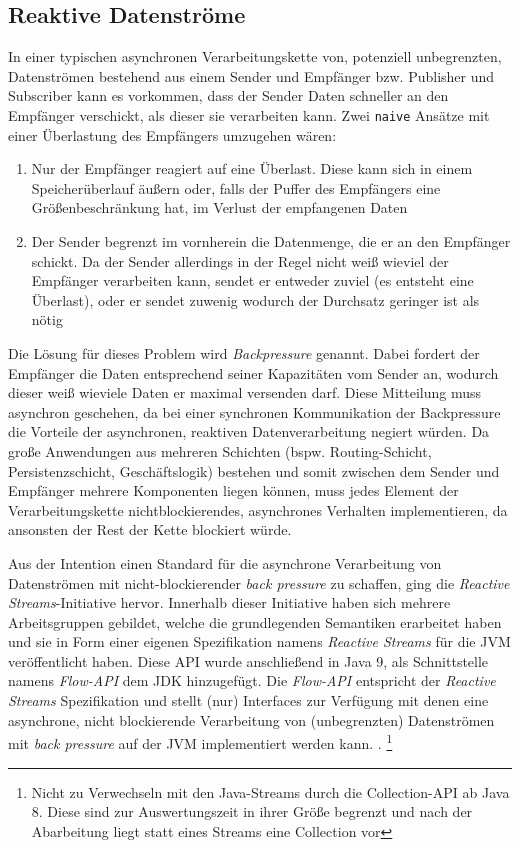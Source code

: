 \subsection{Reaktive Datenströme}
\label{section:reaktive_datenströme}
In einer typischen asynchronen Verarbeitungskette von, potenziell unbegrenzten, Datenströmen
bestehend aus einem Sender und Empfänger bzw. Publisher und Subscriber kann es vorkommen,
dass der Sender Daten schneller an den Empfänger verschickt, als dieser sie verarbeiten kann.
Zwei \verb|naive| Ansätze mit einer Überlastung des Empfängers umzugehen wären:
\begin{enumerate}
    \item Nur der Empfänger reagiert auf eine Überlast. Diese kann sich in einem Speicherüberlauf äußern oder, falls der Puffer des Empfängers eine Größenbeschränkung
          hat, im Verlust der empfangenen Daten
    \item Der Sender begrenzt im vornherein die Datenmenge, die er an den Empfänger schickt. Da der Sender allerdings in der Regel nicht weiß wieviel der Empfänger
          verarbeiten kann, sendet er entweder zuviel (es entsteht eine Überlast), oder er sendet zuwenig wodurch der Durchsatz geringer ist als nötig \parencite{JavaSpektrum2015}
\end{enumerate}
Die Lösung für dieses Problem wird \textit{Backpressure} genannt.
Dabei fordert der Empfänger die Daten entsprechend seiner Kapazitäten vom Sender an, wodurch dieser weiß wieviele Daten er maximal versenden darf.
Diese Mitteilung muss asynchron geschehen, da bei einer synchronen Kommunikation der Backpressure die Vorteile der asynchronen, reaktiven Datenverarbeitung
negiert würden.
Da große Anwendungen aus mehreren Schichten (bspw. Routing-Schicht, Persistenzschicht, Geschäftslogik) bestehen und somit zwischen
dem Sender und Empfänger mehrere Komponenten liegen können, muss jedes
Element der Verarbeitungskette nichtblockierendes, asynchrones Verhalten implementieren, da ansonsten der Rest der Kette blockiert würde.

Aus der Intention einen Standard für die asynchrone Verarbeitung von Datenströmen mit nicht-blockierender \textit{back pressure}
zu schaffen, ging die \textit{Reactive Streams}-Initiative hervor.
Innerhalb dieser Initiative haben sich mehrere Arbeitsgruppen gebildet, welche die grundlegenden Semantiken erarbeitet haben und
sie in Form einer eigenen Spezifikation namens \textit{Reactive Streams} für die JVM veröffentlicht haben.\parencite{ReactiveStreams}
Diese API wurde anschließend in Java 9, als Schnittstelle namens \textit{Flow-API} dem JDK hinzugefügt.
Die \textit{Flow-API} entspricht der \textit{Reactive Streams} Spezifikation und stellt (nur) Interfaces zur Verfügung mit denen eine
asynchrone, nicht blockierende Verarbeitung von (unbegrenzten) Datenströmen mit \textit{back pressure} auf der JVM implementiert werden kann.
\parencite{OracleFlow}.
\footnote{Nicht zu Verwechseln mit den Java-Streams durch die Collection-API ab Java 8. Diese sind zur Auswertungszeit in ihrer Größe begrenzt und
    nach der Abarbeitung liegt statt eines Streams eine Collection vor}

